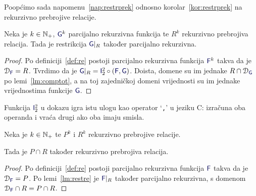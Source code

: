
Poopćimo sada napomenu~\ref{nap:restrprek} odnosno korolar~\ref{kor:restrprek} na rekurzivno prebrojive relacije.

\begin{lema}\label{lm:restre}
Neka je $k\in{\mathbb N}_+$, $\f G^k$ parcijalno rekurzivna funkcija te $R^k$ rekurzivno prebrojiva relacija. Tada je restrikcija $\f G|_R$ također parcijalno rekurzivna.
\end{lema}
\begin{proof}
	Po definiciji~\ref{def:re} postoji parcijalno rekurzivna funkcija $\f F^k$ takva da je $\dom{\f F}=R$. Tvrdimo da je $\f G|_R=\f I_2^2\circ(\f F,\f G)$. Doista, domene su im jednake $R\cap\dom{\f G}$ po lemi~\ref{lm:comptot}, a na toj zajedničkoj domeni vrijednosti su im jednake vrijednostima funkcije $\f G$.
\end{proof}
Funkcija $\f I_2^2$ u dokazu igra istu ulogu kao operator `\texttt,' u jeziku C: izračuna oba operanda i vraća drugi ako oba imaju smisla.

\begin{propozicija}[{name=[rekurzivna prebrojivost presjeka rekurzivno prebrojivih]}]\label{pp:prlre}
Neka je $k\in{\mathbb N}_+$ te $P^k$ i $R^k$ rekurzivno prebrojive relacije.
	
	Tada je $P\cap R$ također rekurzivno prebrojiva relacija.
\end{propozicija}
\begin{proof}
	Po definiciji~\ref{def:re} postoji parcijalno rekurzivna funkcija $\f F$ takva da je $\dom{\f F}=P$. Po lemi~\ref{lm:restre} je $\f F|_R$ također parcijalno rekurzivna, s domenom $\dom{\f F}\cap R=P\cap R$.
\end{proof}

